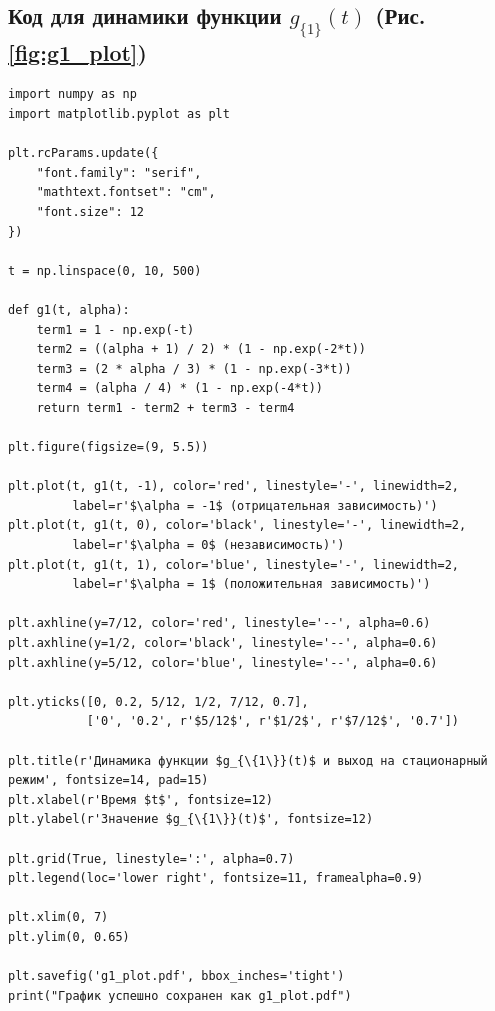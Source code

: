 \documentclass[12pt]{article}
\theoremstyle{plain}
\theoremstyle{definition}
\theoremstyle{remark}
\begin{document}
\subsection*{Код для динамики функции $g_{\{1\}}(t)$ (Рис. \ref{fig:g1_plot})}
\begin{lstlisting}
import numpy as np
import matplotlib.pyplot as plt

plt.rcParams.update({
    "font.family": "serif",
    "mathtext.fontset": "cm",
    "font.size": 12
})

t = np.linspace(0, 10, 500)

def g1(t, alpha):
    term1 = 1 - np.exp(-t)
    term2 = ((alpha + 1) / 2) * (1 - np.exp(-2*t))
    term3 = (2 * alpha / 3) * (1 - np.exp(-3*t))
    term4 = (alpha / 4) * (1 - np.exp(-4*t))
    return term1 - term2 + term3 - term4

plt.figure(figsize=(9, 5.5))

plt.plot(t, g1(t, -1), color='red', linestyle='-', linewidth=2, 
         label=r'$\alpha = -1$ (отрицательная зависимость)')
plt.plot(t, g1(t, 0), color='black', linestyle='-', linewidth=2, 
         label=r'$\alpha = 0$ (независимость)')
plt.plot(t, g1(t, 1), color='blue', linestyle='-', linewidth=2, 
         label=r'$\alpha = 1$ (положительная зависимость)')

plt.axhline(y=7/12, color='red', linestyle='--', alpha=0.6)   
plt.axhline(y=1/2, color='black', linestyle='--', alpha=0.6)  
plt.axhline(y=5/12, color='blue', linestyle='--', alpha=0.6)  

plt.yticks([0, 0.2, 5/12, 1/2, 7/12, 0.7], 
           ['0', '0.2', r'$5/12$', r'$1/2$', r'$7/12$', '0.7'])

plt.title(r'Динамика функции $g_{\{1\}}(t)$ и выход на стационарный режим', fontsize=14, pad=15)
plt.xlabel(r'Время $t$', fontsize=12)
plt.ylabel(r'Значение $g_{\{1\}}(t)$', fontsize=12)

plt.grid(True, linestyle=':', alpha=0.7)
plt.legend(loc='lower right', fontsize=11, framealpha=0.9)

plt.xlim(0, 7)
plt.ylim(0, 0.65)

plt.savefig('g1_plot.pdf', bbox_inches='tight')
print("График успешно сохранен как g1_plot.pdf")
\end{lstlisting}
\end{document}
